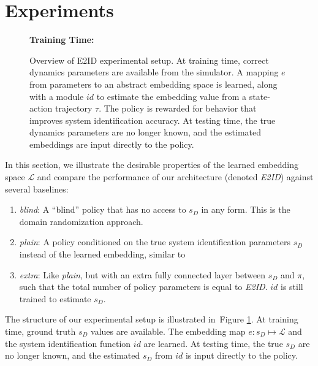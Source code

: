 \documentclass{article}
\newcommand{\TODO}[1]{\textcolor{red}{\textbf{TODO: #1}}}
\newcommand{\cL}{\mathcal{L}}
\newcommand{\cS}{\mathcal{S}}
\newcommand{\blind}{\emph{blind}}
\newcommand{\plain}{\emph{plain}}
\newcommand{\extra}{\emph{extra}}
\newcommand{\embed}{\emph{E2ID}}
\newcommand{\traj}{\emph{traj}}
\newcommand{\embedfn}{e}
\newcommand{\idfn}{id}
\newcommand{\latent}{\cL}
\newcommand{\figref}[1]{Figure \ref{#1}}
\begin{document}
\section{Experiments}

\begin{figure}[ht]
\centering
\textbf{Training Time:}

\vspace{0.4cm}

\vspace{0.4cm}
\caption{
Overview of E2ID experimental setup.
At training time, correct dynamics parameters are available from the simulator.
A mapping $\embedfn$ from parameters to an abstract embedding space is learned,
along with a module $\idfn$ to estimate the embedding value from a state-action trajectory $\tau$.
The policy is rewarded for behavior that improves system identification accuracy.
At testing time, the true dynamics parameters are no longer known,
and the estimated embeddings are input directly to the policy.
}
\label{fig:overview}
\end{figure}

In this section, we illustrate the desirable properties of the learned embedding space $\latent$
and compare the performance of our architecture (denoted \embed) against several baselines:
\begin{enumerate}
\item \blind{}: A ``blind'' policy that has no access to $s_D$ in any form. This is the domain randomization approach.
\item \plain{}: A policy conditioned on the true system identification parameters $s_D$ instead of the learned embedding, similar to~\citet{yu-up-osi-rss17}
\item \extra{}: Like \plain{}, but with an extra fully connected layer between $s_D$ and $\pi$, such that the total number of policy parameters is equal to \embed.  $\idfn$ is still trained to estimate $s_D$.
\end{enumerate}
The structure of our experimental setup is illustrated in~\figref{fig:overview}.
At training time, ground truth $s_D$ values are available.
The embedding map $\embedfn : s_D \mapsto \latent$ 
and the system identification function $\idfn$ are learned.
At testing time, the true $s_D$ are no longer known,
and the estimated $s_D$ from $\idfn$ is input directly to the policy.
\end{document}
